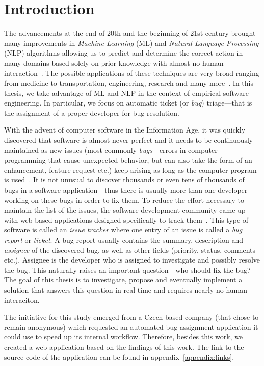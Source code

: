 \chapter{Introduction}

The advancements at the end of 20th and the beginning of 21st century brought many improvements in \textit{Machine Learning} (ML) and \textit{Natural Language Processing} (NLP) algorithms allowing us to predict and determine the correct action in many domains based solely on prior knowledge with almost no human interaction~\cite{carbonell1983overview}. The possible applications of these techniques are very broad ranging from medicine to transportation, engineering, research and many more~\cite{kononenko2001machine, nguyen1990neural}. In this thesis, we take advantage of ML and NLP in the context of empirical software engineering. In particular, we focus on automatic ticket (or \textit{bug}) triage---that is the assignment of a proper developer for bug resolution.

With the advent of computer software in the Information Age, it was quickly discovered that software is almost never perfect and it needs to be continuously maintained as new issues (most commonly \textit{bugs}---errors in computer programming that cause unexpected behavior, but can also take the form of an enhancement, feature request etc.) keep arising as long as the computer program is used~\cite{nist2002}. It is not unusual to discover thousands or even tens of thousands of bugs in a software application---thus there is usually more than one developer working on these bugs in order to fix them. To reduce the effort necessary to maintain the list of the issues, the software development community came up with web-based applications designed specifically to track them~\cite{bertram2010communication}. This type of software is called an \textit{issue tracker} where one entry of an issue is called a \textit{bug report} or \textit{ticket}. A bug report usually contains the summary, description and \textit{assignee} of the discovered bug, as well as other fields (priority, status, comments etc.). Assignee is the developer who is assigned to investigate and possibly resolve the bug. This naturally raises an important question---who should fix the bug?~\cite{Anvik2006} The goal of this thesis is to investigate, propose and eventually implement a solution that answers this question in real-time and requires nearly no human interaciton.

The initiative for this study emerged from a Czech-based company (that chose to remain anonymous) which requested an automated bug assignment application it could use to speed up its internal workflow. Therefore, besides this work, we created a web application based on the findings of this work. The link to the source code of the application can be found in appendix~\ref{appendix:links}.

